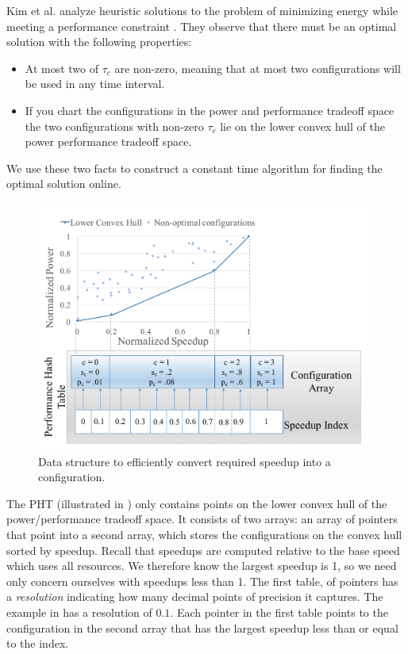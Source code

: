 Kim et al. analyze heuristic solutions to the problem of minimizing
energy while meeting a performance constraint \cite{kim-cpsna}.  They
observe that there must be an optimal solution with the following
properties:
\begin{itemize}
\item At most two of $\tau_c$ are non-zero, meaning that at most two
  configurations will be used in any time interval.
\item If you chart the configurations in the power and performance
  tradeoff space the two configurations with non-zero $\tau_c$ lie on
  the lower convex hull of the power performance tradeoff space.
\end{itemize}
We use these two facts to construct a constant time algorithm for
finding the optimal solution online.

\begin{figure}
\includegraphics[width=\columnwidth]{figures/performance-hash-table.pdf}
\caption{Data structure to efficiently convert required speedup into a
  configuration.}
  \label{fig:pht}
\end{figure}

The PHT (illustrated in ) only contains points on the
lower convex hull of the power/performance tradeoff space.  It
consists of two arrays: an array of pointers that point into a second
array, which stores the configurations on the convex hull sorted by
speedup.  Recall that speedups are computed relative to the base speed
which uses all resources.  We therefore know the largest speedup is 1,
so we need only concern ourselves with speedups less than 1.  The
first table, of pointers has a \emph{resolution} indicating how many
decimal points of precision it captures.  The example in
 has a resolution of $0.1$.  Each pointer in the first
table points to the configuration in the second array that has the
largest speedup less than or equal to the index.

